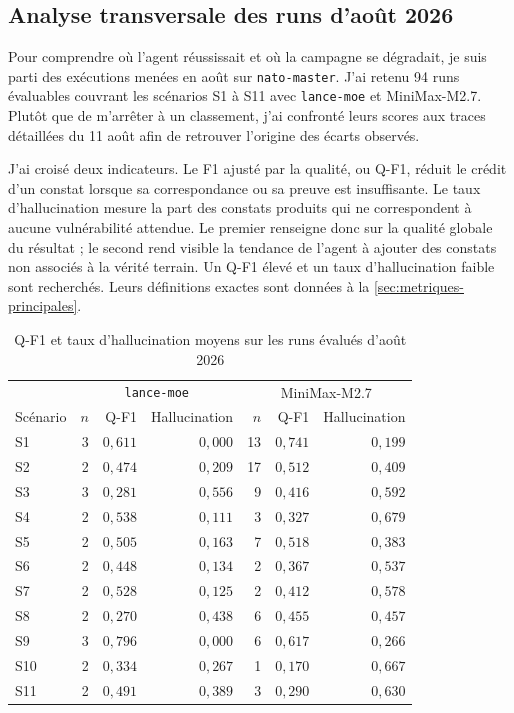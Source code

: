 \subsection{Analyse transversale des runs d'août 2026}
\label{sec:resultats-provisoires}

Pour comprendre où l'agent réussissait et où la campagne se dégradait, je suis
parti des exécutions menées en août sur \texttt{\footnotesize nato-master}.
J'ai retenu 94 runs évaluables couvrant les scénarios S1 à S11 avec
\texttt{\footnotesize lance-moe} et MiniMax-M2.7. Plutôt que de m'arrêter à un
classement, j'ai confronté leurs scores aux traces détaillées du 11 août afin
de retrouver l'origine des écarts observés.

J'ai croisé deux indicateurs. Le F1 ajusté par la qualité, ou Q-F1, réduit le
crédit d'un constat lorsque sa correspondance ou sa preuve est insuffisante.
Le taux d'hallucination mesure la part des constats produits qui ne
correspondent à aucune vulnérabilité attendue. Le premier renseigne donc sur la
qualité globale du résultat ; le second rend visible la tendance de l'agent à
ajouter des constats non associés à la vérité terrain. Un Q-F1 élevé et un taux
d'hallucination faible sont recherchés. Leurs définitions exactes sont données à
la \cref{sec:metriques-principales}.

\begin{table}[H]
  \centering
  \small
  \caption{Q-F1 et taux d'hallucination moyens sur les runs évalués d'août 2026}
  \label{tab:resultats-aout}
  \begin{tabular}{lrrrrrr}
    \toprule
    & \multicolumn{3}{c}{\texttt{lance-moe}}
    & \multicolumn{3}{c}{MiniMax-M2.7} \\
    Scénario & \(n\) & Q-F1 & Hallucination & \(n\) & Q-F1 & Hallucination \\
    \midrule
    S1  & 3 & \(0{,}611\) & \(0{,}000\) & 13 & \(0{,}741\) & \(0{,}199\) \\
    S2  & 2 & \(0{,}474\) & \(0{,}209\) & 17 & \(0{,}512\) & \(0{,}409\) \\
    S3  & 3 & \(0{,}281\) & \(0{,}556\) &  9 & \(0{,}416\) & \(0{,}592\) \\
    S4  & 2 & \(0{,}538\) & \(0{,}111\) &  3 & \(0{,}327\) & \(0{,}679\) \\
    S5  & 2 & \(0{,}505\) & \(0{,}163\) &  7 & \(0{,}518\) & \(0{,}383\) \\
    S6  & 2 & \(0{,}448\) & \(0{,}134\) &  2 & \(0{,}367\) & \(0{,}537\) \\
    S7  & 2 & \(0{,}528\) & \(0{,}125\) &  2 & \(0{,}412\) & \(0{,}578\) \\
    S8  & 2 & \(0{,}270\) & \(0{,}438\) &  6 & \(0{,}455\) & \(0{,}457\) \\
    S9  & 3 & \(0{,}796\) & \(0{,}000\) &  6 & \(0{,}617\) & \(0{,}266\) \\
    S10 & 2 & \(0{,}334\) & \(0{,}267\) &  1 & \(0{,}170\) & \(0{,}667\) \\
    S11 & 2 & \(0{,}491\) & \(0{,}389\) &  3 & \(0{,}290\) & \(0{,}630\) \\
    \bottomrule
  \end{tabular}
\end{table}

